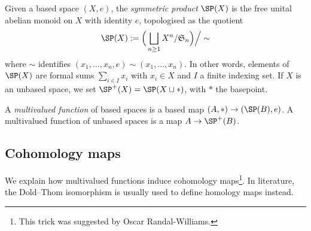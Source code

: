 Given a based space $(X,e)$, the \textit{symmetric product} $\SP(X)$ is the free unital abelian monoid on $X$ with identity $e$, topologised as the quotient
\begin{equation*}
    \SP(X):=\Big(\bigsqcup_{n\ge 1} X^n/\mathfrak{S}_n \Big)\Big/\sim
\end{equation*}
where $\sim$ identifies $(x_1,...,x_n,e)\sim (x_1,...,x_n)$. In other words, elements of $\SP(X)$ are formal sums $\sum_{i\in I} x_i$ with $x_i\in X$ and $I$ a finite indexing set. If $X$ is an unbased space, we set $\SP^+(X)=\SP(X\sqcup *)$, with $*$ the basepoint.


A \textit{multivalued function} of based spaces is a based map $(A,*)\to (\SP(B),e)$. A multivalued function of unbased spaces is a map $A\to \SP^+(B)$.


\subsection{Cohomology maps}\label{sec:DoldThomCohomology}
We explain how multivalued functions induce cohomology maps\footnote{This trick was suggested by Oscar Randal-Williams.}. In literature, the Dold--Thom isomorphism \cite{DoldThom} is usually used to define homology maps instead.

